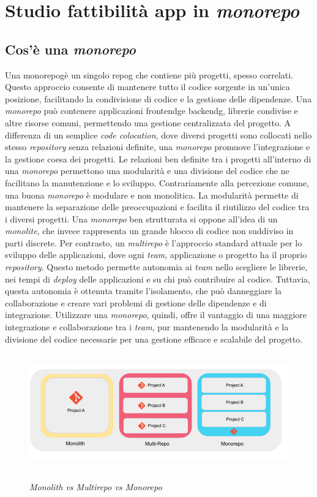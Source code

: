 \chapter{Studio fattibilità app in \textit{monorepo}}
\label{chap:studio_fattibilita}
\section{Cos'è una \textit{monorepo}}
Una \gls{monorepog}\glox è un singolo \gls{repog} che contiene più progetti, spesso correlati.
Questo approccio consente di mantenere tutto il codice sorgente in un'unica posizione, facilitando la condivisione di codice e la gestione delle dipendenze.
Una \textit{monorepo} può contenere applicazioni \gls{frontendg}\glox e \gls{backendg}\glox, librerie condivise e altre risorse comuni, permettendo una gestione centralizzata del progetto.
A differenza di un semplice \textit{code colocation}, dove diversi progetti sono collocati nello stesso \textit{repository} senza relazioni definite, una \textit{monorepo} promuove l'integrazione e la gestione coesa dei progetti.
Le relazioni ben definite tra i progetti all'interno di una \textit{monorepo} permettono una modularità e una divisione del codice che ne facilitano la manutenzione e lo sviluppo.
Contrariamente alla percezione comune, una buona \textit{monorepo} è modulare e non monolitica.
La modularità permette di mantenere la separazione delle preoccupazioni e facilita il riutilizzo del codice tra i diversi progetti.
Una \textit{monorepo} ben strutturata si oppone all'idea di un \textit{monolite}, che invece rappresenta un grande blocco di codice non suddiviso in parti discrete.
Per contrasto, un \textit{multirepo} è l'approccio standard attuale per lo sviluppo delle applicazioni, dove ogni \textit{team}, applicazione o progetto ha il proprio \textit{repository}.
Questo metodo permette autonomia ai \textit{team} nello scegliere le librerie, nei tempi di \textit{deploy} delle applicazioni e su chi può contribuire al codice.
Tuttavia, questa autonomia è ottenuta tramite l'isolamento, che può danneggiare la collaborazione e creare vari problemi di gestione delle dipendenze e di integrazione.
Utilizzare una \textit{monorepo}, quindi, offre il vantaggio di una maggiore integrazione e collaborazione tra i \textit{team}, pur mantenendo la modularità e la divisione del codice necessarie per una gestione efficace e scalabile del progetto.

\begin{figure}[H]
\centering
\includegraphics[alt={Differenze tra \textit{monolith multi-repo e monorepo}}, height=5cm]{img/monorepocompare.png}
\caption{\textit{Monolith vs Multirepo vs Monorepo}}
\label{fig
}
\end{figure}

